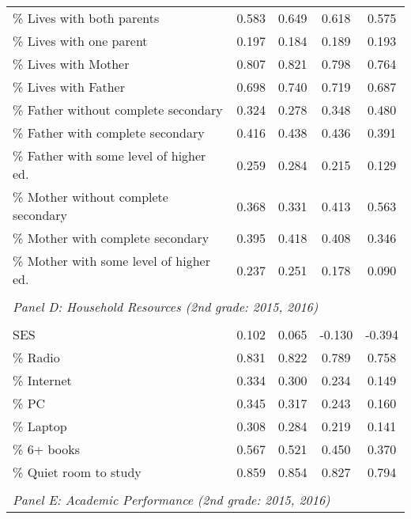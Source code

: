 {\begin{tabular}{lcccc}
\% Lives with both parents&       0.583&       0.649&       0.618&       0.575\\
\% Lives with one parent&       0.197&       0.184&       0.189&       0.193\\
\% Lives with Mother&       0.807&       0.821&       0.798&       0.764\\
\% Lives with Father&       0.698&       0.740&       0.719&       0.687\\
\% Father without complete secondary&       0.324&       0.278&       0.348&       0.480\\
\% Father with complete secondary&       0.416&       0.438&       0.436&       0.391\\
\% Father with some level of higher ed.&       0.259&       0.284&       0.215&       0.129\\
\% Mother without complete secondary&       0.368&       0.331&       0.413&       0.563\\
\% Mother with complete secondary&       0.395&       0.418&       0.408&       0.346\\
\% Mother with some level of higher ed.&       0.237&       0.251&       0.178&       0.090\\
&  &  &   \\
\multicolumn{4}{l}{\textit{Panel D: Household Resources (2nd grade: 2015, 2016)}} \\
            &            &            &            &            \\
SES         &       0.102&       0.065&      -0.130&      -0.394\\
\% Radio    &       0.831&       0.822&       0.789&       0.758\\
\% Internet &       0.334&       0.300&       0.234&       0.149\\
\% PC       &       0.345&       0.317&       0.243&       0.160\\
\% Laptop   &       0.308&       0.284&       0.219&       0.141\\
\% 6+ books &       0.567&       0.521&       0.450&       0.370\\
\% Quiet room to study&       0.859&       0.854&       0.827&       0.794\\
&  &  &   \\
\multicolumn{4}{l}{\textit{Panel E: Academic Performance (2nd grade: 2015, 2016)}} \\

\end{tabular}}
